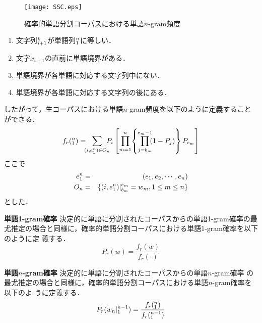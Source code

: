 \begin{list}{}{}
\begin{figure}[t]
  \begin{center}
        \texttt{[image: SSC.eps]}
  \end{center}
  \caption{確率的単語分割コーパスにおける単語$n$-gram頻度}
  \label{figure:SSC}
\end{figure}

  \begin{enumerate}
  \item 文字列$\Bdma{x}_{i+1}^{k}$が単語列$\Bdma{w}_{1}^{n}$に等しい．
  \item 文字$x_{i+1}$の直前に単語境界がある．
  \item 単語境界が各単語に対応する文字列中にない．
  \item 単語境界が各単語に対応する文字列の後にある．
  \end{enumerate}
  したがって，生コーパスにおける単語$n$-gram頻度を以下のように定義することができる．
  \begin{displaymath}
    f_{r}(\Bdma{w}_{1}^{n})
    = \!\!\!
    \sum_{(i,e_{1}^{n}) \in O_{n}} \!\!\!\! P_{i} \left[
    \prod_{m=1}^{n} \! \left\{
    \prod_{j=b_{m}}^{e_{m}-1} \!\! (1-P_{j}) \right\}
    P_{e_{m}} \right]
  \end{displaymath}
  ここで
  \begin{eqnarray*}
    e_{1}^{n}
    & = & (e_{1},e_{2},\cdots,e_{n}) \\
    O_{n}     
    & = & \{(i,e_{1}^{n}) | \Bdma{x}_{b_{m}}^{e_{m}} = w_{m}, 1 \leq m \leq n \}
  \end{eqnarray*}
  とした．

\item[\textbf{単語1-gram確率}] 決定的に単語に分割されたコーパスからの単語1-gram確率の最
  尤推定の場合と同様に，確率的単語分割コーパスにおける単語1-gram確率を以下のように定
  義する．
  \begin{equation}
    \label{equation:1-gram}
    P_{r}(w) = \frac{f_{r}(w)}{f_{r}(\cdot)}
  \end{equation}

\item[\textbf{単語$n$-gram確率}] 決定的に単語に分割されたコーパスからの単語$n$-gram確率
  の最尤推定の場合と同様に，確率的単語分割コーパスにおける単語$n$-gram確率を以下のよ
  うに定義する．
  \begin{equation}
    \label{equation:n-gram}
    P_r(w_{n}|\Bdma{w}_{1}^{n-1})
    = \frac{f_r(\Bdma{w}_{1}^{n})}{f_r(\Bdma{w}_{1}^{n-1})}
  \end{equation}

\end{list}



